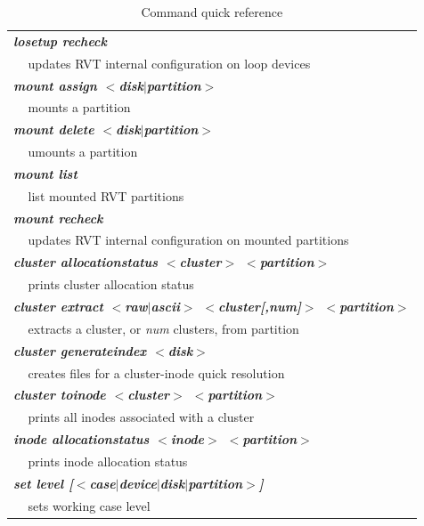 \documentclass[a4paper,11pt,oneside]{report}
\begin{document}
\begin{table}[p]
\begin{tabular}{| p{1cm}  p{10cm} | }
\multicolumn{2}{|l|}{\it \bf
losetup recheck
} \\
 & updates RVT internal configuration on loop devices \\

\hline \hline

\multicolumn{2}{|l|}{\it \bf
mount assign $<$disk$|$partition$>$
} \\
 & mounts a partition \\

\multicolumn{2}{|l|}{\it \bf
mount delete $<$disk$|$partition$>$
} \\
 & umounts a partition \\

\multicolumn{2}{|l|}{\it \bf
mount list 
} \\
 & list mounted RVT partitions \\

\multicolumn{2}{|l|}{\it \bf
mount recheck
} \\
 & updates RVT internal configuration on mounted partitions \\

\hline \hline

\multicolumn{2}{|l|}{\it \bf
cluster allocationstatus $<$cluster$>$ $<$partition$>$
} \\
 & prints cluster allocation status \\


\multicolumn{2}{|l|}{\it \bf
cluster extract $<$raw$|$ascii$>$ $<$cluster[,num]$>$ $<$partition$>$
} \\
 & extracts a cluster, or \emph{num} clusters, from partition \\


\multicolumn{2}{|l|}{\it \bf
cluster generateindex $<$disk$>$
} \\
 & creates files for a cluster-inode quick resolution \\


\multicolumn{2}{|l|}{\it \bf
cluster toinode $<$cluster$>$ $<$partition$>$
} \\
 & prints all inodes associated with a cluster \\

\hline \hline

\multicolumn{2}{|l|}{\it \bf
inode allocationstatus $<$inode$>$ $<$partition$>$
} \\
 & prints inode allocation status \\

\hline \hline

\multicolumn{2}{|l|}{\it \bf
set level [$<$case$|$device$|$disk$|$partition$>$]
} \\
 & sets working case level \\

\hline

\end{tabular}

\caption{Command quick reference}\label{tbl:cmd-ref}


\end{table}
\end{document}
